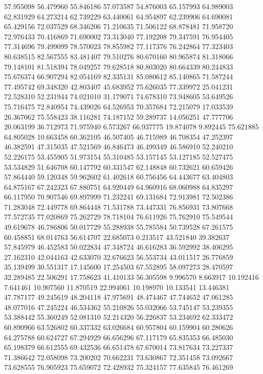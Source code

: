 57.955098
56.479960
55.846186
57.073587
54.876003
65.157993
64.989003
62.831929
64.273214
62.739229
63.440061
64.954897
62.239906
64.690081
65.429156
72.037529
68.346206
71.210635
71.506122
68.878481
71.958720
72.976433
70.416869
71.690002
73.313040
77.192208
79.347591
76.954405
77.314696
79.499099
78.570023
78.855982
77.117376
76.242864
77.323403
80.638515
82.567555
83.481407
79.510276
80.670160
80.965874
81.318066
79.148101
81.518394
78.049257
79.628518
80.803020
80.664339
80.244833
75.676374
66.907294
82.054169
82.335131
85.080612
85.140865
71.587244
77.495742
69.348320
42.803407
45.683952
75.626035
77.339972
25.041231
72.528310
52.231944
74.021010
31.179071
74.678310
73.948605
53.649526
75.716475
72.840954
74.439026
64.526953
70.357684
72.215079
17.033539
26.367062
75.558423
38.116281
74.187152
59.289737
14.056251
47.777706
20.063199
36.712973
71.975940
6.573267
66.937775
19.874078
9.892445
75.621885
64.805028
10.663458
60.362105
46.507405
46.715989
46.708354
47.252397
46.382591
47.315035
47.521569
46.846473
46.499349
46.586910
52.240210
52.226175
53.455905
51.973154
55.310485
53.157145
53.127185
52.527475
53.534829
51.646708
60.147792
60.331547
62.148848
60.732621
60.659426
57.864440
59.120348
59.962602
61.402618
60.756456
64.443677
63.404803
64.875167
67.242323
67.880751
64.920449
64.960916
68.060988
64.835297
66.117950
70.907546
69.897999
71.232241
69.131684
72.913981
72.502386
71.283048
72.449778
69.864448
71.531788
73.447331
76.856931
73.807668
77.572735
77.020869
75.262729
78.718104
76.611926
75.762910
75.549544
49.619678
46.786806
50.017729
55.288938
55.785584
50.739528
67.261575
60.458851
68.014763
56.614707
22.685073
0.213517
43.521840
39.382637
57.845979
46.452583
50.022834
47.348724
46.616283
36.592992
38.406295
27.162310
42.044163
42.633070
32.676623
56.553734
43.011517
26.776859
35.139499
30.551317
17.145600
17.254503
67.552895
58.097273
28.470597
32.289485
22.506291
17.758623
41.410133
56.305598
9.996570
8.663917
10.192416
7.641461
10.907560
11.870519
22.994061
10.198970
10.133541
13.446381
47.787177
49.245619
48.204118
47.975691
48.474467
47.744652
47.061285
48.077016
47.245224
46.534362
55.210826
55.032066
53.745147
53.239355
53.388442
55.360249
52.081310
52.214320
56.226837
53.234692
62.333472
60.890966
63.526802
60.337332
63.026684
60.957804
60.159904
60.280626
64.275788
60.624727
67.294929
66.656296
67.117179
65.835353
66.485030
65.198379
66.612555
69.432536
66.651478
67.670014
73.817634
73.227337
71.386642
72.058098
73.200202
70.662231
73.630867
72.351458
73.092667
73.628555
76.905923
75.659072
72.428932
75.324157
77.635845
76.461269
